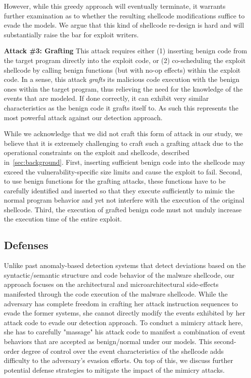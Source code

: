 \documentclass{acm_proc_article-sp}
\begin{document}
However, while this greedy approach will eventually terminate, it warrants further examination as to whether the resulting shellcode modifications suffice to evade the models. We argue that this kind of shellcode re-design is hard and will substantially raise the bar for exploit writers.

\textbf{Attack \#3: Grafting} \space\space 
This attack requires either (1) inserting benign code from the 
target program directly into the exploit code, or (2) co-scheduling 
the exploit shellcode by calling benign functions (but with no-op 
effects) within the exploit code. In a sense, this attack 
\textit{grafts} its malicious code execution with the benign ones 
within the target program, thus relieving the need for the knowledge of 
the events that are modeled. If done correctly, it can exhibit very similar 
characteristics as the benign code it grafts itself to. As such this represents 
the most powerful attack against our detection approach.

While we acknowledge that we did not craft this form of attack in our 
study, we believe that it is extremely challenging to craft
such a grafting attack due to the operational constraints on the 
exploit and shellcode, described in~\ref{sec:background}. 
First, inserting sufficient benign code into 
the shellcode may exceed the vulnerability-specific size limits and
cause the exploit to fail. Second, to use benign functions for the grafting 
attacks, these  functions have to be carefully identified and inserted so that 
they execute sufficiently to mimic the normal program behavior and yet not 
interfere with the execution of the original shellcode. Third, the execution of 
grafted benign code must not unduly increase the execution time of the entire 
exploit.


\subsection{Defenses}

Unlike past anomaly-based detection systems that detect deviations based on the syntactic/semantic structure and code behavior of the malware shellcode, our approach focuses on the architectural and microarchitectural side-effects manifested through the code execution of the malware shellcode. While the adversary has complete freedom in crafting her attack instruction sequences to evade the former systems, she cannot directly modify the events exhibited by her attack code to evade our detection approach. To conduct a mimicry attack here, she has to carefully "massage" his attack code to manifest a combination of event behaviors that are accepted as benign/normal under our models. This second-order degree of control over the event characteristics of the shellcode adds difficulty to the adversary's evasion efforts. On top of this, we discuss further potential defense strategies to mitigate the impact of the mimicry attacks.
\end{document}
